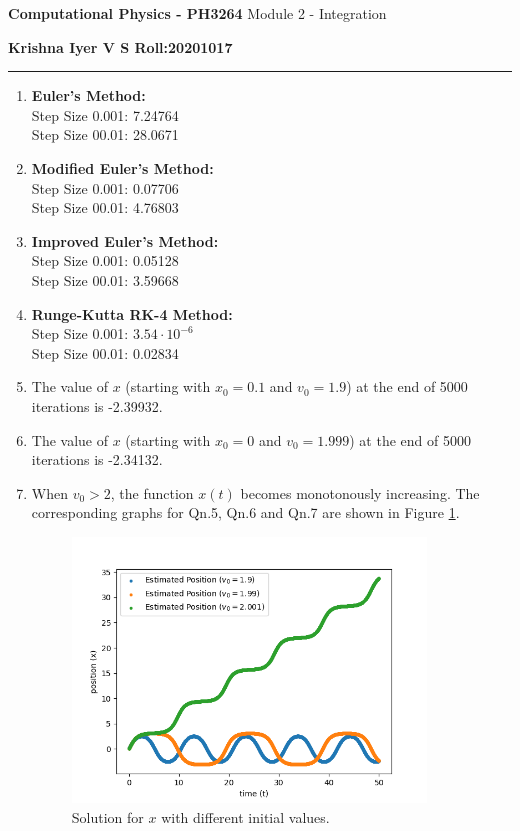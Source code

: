 \documentclass[11 pt]{article}
\begin{document}
\begin{center}
       \large{
       \textbf{Computational Physics - PH3264} \break
	Module 2 - Integration
}
\end{center}

\textbf{Krishna Iyer V S \hfill Roll:20201017}
\hrule 
\vspace{0.3cm}
\begin{enumerate}
\item
\textbf{Euler's Method:}\\
Step Size 0.001: 7.24764\\
Step Size 00.01: 28.0671
\item
\textbf{Modified Euler's Method:}\\
Step Size 0.001: 0.07706\\
Step Size 00.01: 4.76803
\item
\textbf{Improved Euler's Method:}\\
Step Size 0.001: 0.05128\\
Step Size 00.01: 3.59668
\item
\textbf{Runge-Kutta RK-4 Method:}\\
Step Size 0.001: $3.54\cdot10^{-6}$\\
Step Size 00.01: 0.02834

\item The value of $x$ (starting with $x_0 = 0.1$ and $v_0 = 1.9$) at the end of 5000 iterations is -2.39932.
\item The value of $x$ (starting with $x_0 = 0$ and $v_0 = 1.999$) at the end of 5000 iterations is -2.34132.
\item When $v_0 > 2$, the function $x(t)$ becomes monotonously increasing. The corresponding graphs for Qn.5, Qn.6 and Qn.7 are shown in Figure \ref{fig1}.
\begin{figure}[!h]
\center\includegraphics[width=3.7in]{"../figures/Q5-6-7.png"}
\caption{Solution for $x$ with different initial values.}
\label{fig1}
\end{figure}


\end{enumerate}
\end{document}
